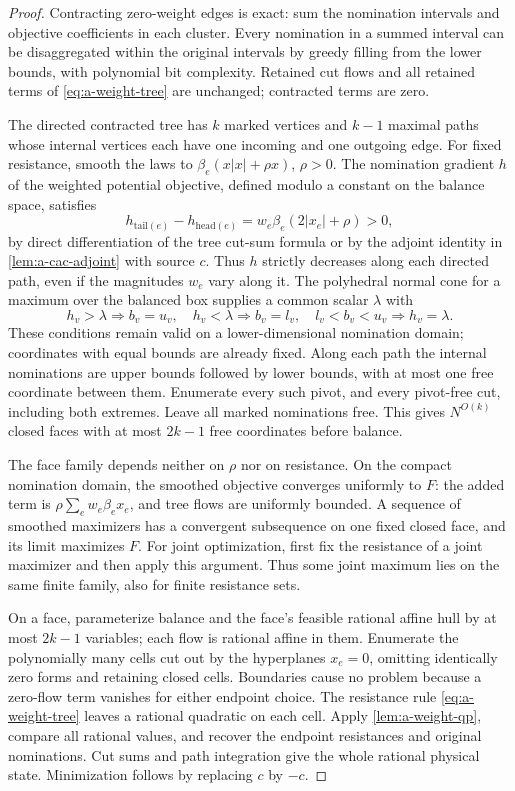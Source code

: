 \begin{proof}
Contracting zero-weight edges is exact: sum the nomination intervals and
objective coefficients in each cluster. Every nomination in a summed
interval can be disaggregated within the original intervals by greedy
filling from the lower bounds, with polynomial bit complexity. Retained
cut flows and all retained terms of \cref{eq:a-weight-tree} are
unchanged; contracted terms are zero.

The directed contracted tree has $k$ marked vertices and $k-1$ maximal
paths whose internal vertices each have one incoming and one outgoing
edge. For fixed resistance, smooth the laws to
$\beta_e(x|x|+\rho x)$, $\rho>0$. The nomination gradient $h$ of the
weighted potential objective, defined modulo a constant on the balance
space, satisfies
\[
 h_{\mathrm{tail}(e)}-h_{\mathrm{head}(e)}
   =w_e\beta_e(2|x_e|+\rho)>0,
\]
by direct differentiation of the tree cut-sum formula or by the adjoint
identity in \cref{lem:a-cac-adjoint} with source $c$.
Thus $h$ strictly decreases along each directed path, even if the
magnitudes $w_e$ vary along it. The polyhedral normal cone for a maximum
over the balanced box supplies a common scalar $\lambda$ with
\begin{equation}
 h_v>\lambda\Rightarrow b_v=u_v,\quad
 h_v<\lambda\Rightarrow b_v=l_v,\quad
 l_v<b_v<u_v\Rightarrow h_v=\lambda.
 \label{eq:a-weight-kkt}
\end{equation}
These conditions remain valid on a lower-dimensional nomination domain;
coordinates with equal bounds are already fixed. Along each path the
internal nominations are upper bounds followed by lower bounds, with
at most one free coordinate between them. Enumerate every such pivot,
and every pivot-free cut, including both extremes. Leave all marked
nominations free. This gives $N^{O(k)}$ closed faces with at most $2k-1$
free coordinates before balance.

The face family depends neither on $\rho$ nor on resistance. On the
compact nomination domain, the smoothed objective converges uniformly to
$F$: the added term is $\rho\sum_e w_e\beta_ex_e$, and tree flows are
uniformly bounded. A sequence of smoothed maximizers has a convergent
subsequence on one fixed closed face, and its limit maximizes $F$. For
joint optimization, first fix the resistance of a joint maximizer and then
apply this argument. Thus some joint maximum lies on the same finite
family, also for finite resistance sets.

On a face, parameterize balance and the face's feasible rational affine
hull by at most $2k-1$ variables; each flow is rational affine in them.
Enumerate the polynomially many cells cut out by the hyperplanes $x_e=0$,
omitting identically zero forms and retaining closed cells. Boundaries
cause no problem because a zero-flow term vanishes for either endpoint
choice. The resistance rule \cref{eq:a-weight-tree} leaves a rational
quadratic on each cell. Apply \cref{lem:a-weight-qp}, compare all rational
values, and recover the endpoint resistances and original nominations.
Cut sums and path integration give the whole rational physical state.
Minimization follows by replacing $c$ by $-c$.


\end{proof}
